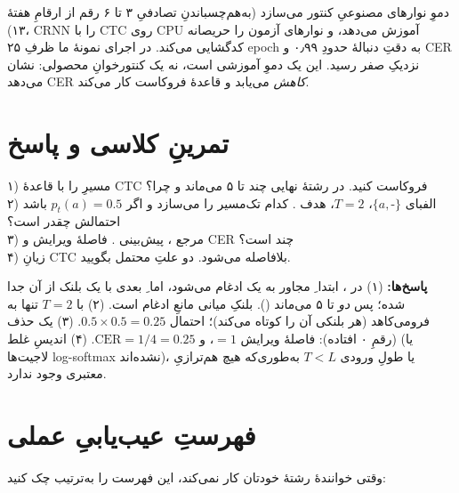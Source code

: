 \documentclass[12pt,a4paper]{article}
\begin{document}
\begin{yaddasht}
دموِ  نوارهای مصنوعیِ کنتور می‌سازد (به‌هم‌چسباندنِ تصادفیِ ۳ تا ۶ رقم از ارقامِ هفتهٔ ۱۳)، CRNN را با CTC روی CPU آموزش می‌دهد، و نوارهای آزمون را حریصانه کدگشایی می‌کند. در اجرای نمونهٔ ما ظرفِ ۲۵ epoch به دقتِ دنبالهٔ حدودِ ۰٫۹۹ و CER نزدیکِ صفر رسید. این یک دموِ آموزشی است، نه یک کنتورخوانِ محصولی: نشان می‌دهد CER \emph{کاهش} می‌یابد و قاعدهٔ فروکاست کار می‌کند.
\end{yaddasht}

\section{تمرینِ کلاسی و پاسخ}

\begin{tamrin}
۱) مسیرِ  را با قاعدهٔ CTC فروکاست کنید. در رشتهٔ نهایی چند تا ۵ می‌ماند و چرا؟\\
۲) الفبای $\{a,\text{-}\}$، $T=2$، هدف . کدام تک‌مسیر  را می‌سازد و اگر $p_t(a)=0.5$ باشد احتمالش چقدر است؟\\
۳) مرجع ، پیش‌بینی . فاصلهٔ ویرایش و CER چند است؟\\
۴) زیانِ CTC بلافاصله  می‌شود. دو علتِ محتمل بگویید.
\end{tamrin}

\textbf{پاسخ‌ها:}
(۱) در ، ابتدا ِ مجاور به یک  ادغام می‌شود، اما ِ بعدی با یک بلنک از آن جدا شده؛ پس \emph{دو} تا ۵ می‌ماند (). بلنکِ میانی مانعِ ادغام است.
(۲) با $T=2$ تنها  به  فرومی‌کاهد (هر بلنکی آن را کوتاه می‌کند)؛ احتمال $0.5\times0.5=0.25$.
(۳) یک حذف (رقمِ ۰ افتاده): فاصلهٔ ویرایش $=1$، و $\text{CER}=1/4=0.25$.
(۴) اندیسِ  غلط (یا لاجیت‌ها log-softmax نشده‌اند)، یا طولِ ورودی $T<L$ به‌طوری‌که هیچ هم‌ترازیِ معتبری وجود ندارد.

\section{فهرستِ عیب‌یابیِ عملی}

وقتی خوانندهٔ رشتهٔ خودتان کار نمی‌کند، این فهرست را به‌ترتیب چک کنید:
\end{document}
